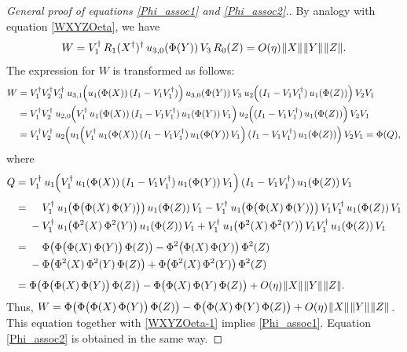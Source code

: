 \documentclass[12pt]{article}
\newcommand{\ts}{\mkern1mu}
\newtheorem[definition]{Definition}[Theorem]{Definition}
\newtheorem[remark]{Example}[Theorem]{Example}
\newtheorem[remark]{Remark}[Theorem]{Remark}
\newtheorem[remark]{Question}[Theorem]{Open question}
\newtheorem*[definition]{definition}{Definition}
\newtheorem*[remark]{example}{Example}
\newtheorem*[remark]{remark}{Remark}
\newtheorem*[remark]{question}{Open question}
\numberwithin{equation}{section}
\begin{document}
\begin{proof}[General proof of equations \eqref{Phi_assoc1} and \eqref{Phi_assoc2}.]
By analogy with equation \eqref{WXYZOeta}, we have
\begin{equation}\label{WXYZOeta-1}
W=V_1^\dag\,R_1(X^\dag)^\dag\,u_{3,0}(\Phi(Y))\,V_3\,R_0(Z)
=O(\eta)\ts\|X\|\ts\|Y\|\ts\|Z\|.
\end{equation}
The expression for $W$ is transformed as follows:
\begin{align*}
W &= V_1^\dag V_{2}^\dag V_{3}^\dag\,\ts u_{3,1}\mkern-1mu\Bigl(
u_1(\Phi(X))\,(I_1-V_1V_1^\dag)\Bigr)\,u_{3,0}(\Phi(Y))\,V_3\,\ts
u_2\mkern-1mu\Bigl((I_1-V_1V_1^\dag)\,u_1(\Phi(Z))\Bigr)\,V_{2}V_{1}
\\
&= V_1^\dag V_{2}^\dag\,\ts u_{2,0}\mkern-1mu\Bigl(
V_1^\dag\,u_1(\Phi(X))\,(I_1-V_1V_1^\dag)\,u_1(\Phi(Y))\,V_1\Bigr)\,
u_2\mkern-1mu\Bigl((I_1-V_1V_1^\dag)\,u_1(\Phi(Z))\Bigr)\,V_{2}V_{1}
\\
&= V_1^\dag V_{2}^\dag\,\ts u_2\mkern-1mu\Bigl(
u_1\mkern-1mu\Bigl(
V_1^\dag\,u_1(\Phi(X))\,(I_1-V_1V_1^\dag)\,u_1(\Phi(Y))\,V_1
\Bigr)\,(I_1-V_1V_1^\dag)\,u_1(\Phi(Z))\Bigr)\,V_{2}V_{1}
=\Phi(Q),
\end{align*}
where
\begin{align*}
Q&=V_1^\dag\,\ts
u_1\mkern-1mu\Bigl(
V_1^\dag\,u_1(\Phi(X))\,(I_1-V_1V_1^\dag)\,u_1(\Phi(Y))\,V_1
\Bigr)\,(I_1-V_1V_1^\dag)\,u_1(\Phi(Z))\,V_1
\\[4pt]
&=\begin{aligned}[t]
&\phantom{\hbox{}+\hbox{}}
V_1^\dag\,\ts u_1\mkern-1mu\bigl(\Phi\bigl(\Phi(X)\,\Phi(Y)\bigr)\bigr)\,
u_1(\Phi(Z))\,V_1
-V_1^\dag\,\ts u_1\mkern-1mu\bigl(\Phi\bigl(\Phi(X)\,\Phi(Y)\bigr)\bigr)\,
V_1V_1^\dag\,u_1(\Phi(Z))\,V_1\\
&-V_1^\dag\,\ts u_1\mkern-1mu\bigl(\Phi^2(X)\,\Phi^2(Y)\bigr)\,
u_1(\Phi(Z))\,V_1
+V_1^\dag\,\ts u_1\mkern-1mu\bigl(\Phi^2(X)\,\Phi^2(Y)\bigr)\,
V_1V_1^\dag\,u_1(\Phi(Z))\,V_1
\end{aligned}
\\[4pt]
&=\begin{aligned}[t]
&\phantom{\hbox{}+\hbox{}}
\Phi\bigl(\Phi\bigl(\Phi(X)\,\Phi(Y)\bigr)\,\Phi(Z)\bigr)
-\Phi^2\bigl(\Phi(X)\,\Phi(Y)\bigr)\,\Phi^2(Z)\\
&-\Phi\bigl(\Phi^2(X)\,\Phi^2(Y)\,\Phi(Z)\bigr)
+\Phi\bigl(\Phi^2(X)\,\Phi^2(Y)\bigr)\,\Phi^2(Z)
\end{aligned}
\\[4pt]
&=\Phi\bigl(\Phi\bigl(\Phi(X)\,\Phi(Y)\bigr)\,\Phi(Z)\bigr)
-\Phi\bigl(\Phi(X)\,\Phi(Y)\,\Phi(Z)\bigr)
+O(\eta)\ts\|X\|\ts\|Y\|\ts\|Z\|.
\end{align*}
Thus, $W=\Phi\bigl(\Phi\bigl(\Phi(X)\,\Phi(Y)\bigr)\,\Phi(Z)\bigr)
-\Phi\bigl(\Phi(X)\,\Phi(Y)\,\Phi(Z)\bigr)
+O(\eta)\ts\|X\|\ts\|Y\|\ts\|Z\|$. This equation together with \eqref{WXYZOeta-1} implies \eqref{Phi_assoc1}. Equation \eqref{Phi_assoc2} is obtained in the same way.
\end{proof}
\end{document}

